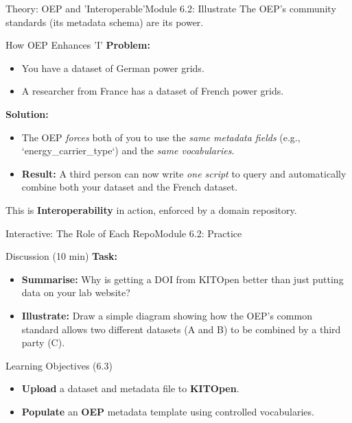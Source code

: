 \begin{frame}{Theory: OEP and 'Interoperable'}{Module 6.2: Illustrate}
    The OEP's community standards (its metadata schema) are its power.
    
    \begin{block}{How OEP Enhances 'I'}
        \textbf{Problem:}
        \begin{itemize}
            \item You have a dataset of German power grids.
            \item A researcher from France has a dataset of French power grids.
        \end{itemize}
        \pause
        \textbf{Solution:}
        \begin{itemize}
            \item The OEP \emph{forces} both of you to use the \emph{same metadata fields} (e.g., `energy\_carrier\_type`) and the \emph{same vocabularies}.
            \pause
            \item \textbf{Result:} A third person can now write \emph{one script} to query and automatically combine both your dataset and the French dataset.
        \end{itemize}
    \end{block}
    This is \textbf{Interoperability} in action, enforced by a domain repository.
\end{frame}

\begin{frame}{Interactive: The Role of Each Repo}{Module 6.2: Practice}
    \begin{block}{Discussion (10 min)}
        \textbf{Task:}
        \begin{itemize}
            \item \textbf{Summarise:} Why is getting a DOI from KITOpen better than just putting data on your lab website?
            \pause
            \item \textbf{Illustrate:} Draw a simple diagram showing how the OEP's common standard allows two different datasets (A and B) to be combined by a third party (C).
        \end{itemize}
    \end{block}
\end{frame}

\begin{frame}{Learning Objectives (6.3)}
    \begin{itemize}
        \item \textbf{Upload} a dataset and metadata file to \textbf{KITOpen}.
        \item \textbf{Populate} an \textbf{OEP} metadata template using controlled vocabularies.
    \end{itemize}
\end{frame}


